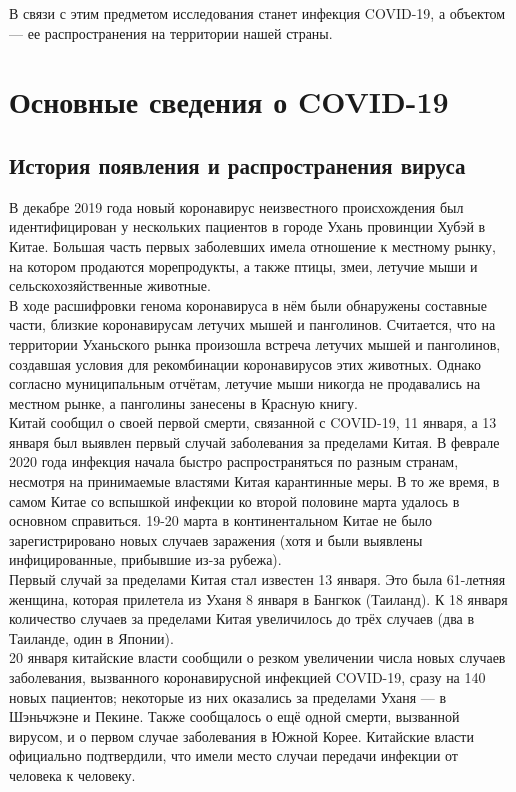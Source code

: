 \documentclass[a4paper, 12pt]{extarticle}
\begin{document}
В связи с этим предметом исследования станет инфекция
COVID-19, а объектом — ее распространения на территории нашей страны.
\newpage

\section{Основные сведения о COVID-19}
\subsection{История появления и распространения вируса}

В декабре 2019 года новый коронавирус неизвестного происхождения был
идентифицирован у нескольких пациентов в городе Ухань провинции Хубэй в Китае.
Большая часть первых заболевших имела отношение к местному рынку, на котором
продаются морепродукты, а также птицы, змеи, летучие мыши и
сельскохозяйственные животные.
\\

В ходе расшифровки генома коронавируса в нём были обнаружены составные части, близкие коронавирусам летучих мышей и
панголинов. Считается, что на территории Уханьского рынка произошла встреча
летучих мышей и панголинов, создавшая условия для рекомбинации коронавирусов
этих животных. Однако согласно муниципальным отчётам, летучие мыши никогда не
продавались на местном рынке, а панголины занесены в Красную книгу.
\\

Китай сообщил о своей первой смерти, связанной с COVID-19, 11 января, а 13
января был выявлен первый случай заболевания за пределами Китая. В феврале 2020
года инфекция начала быстро распространяться по разным странам, несмотря на
принимаемые властями Китая карантинные меры. В то же время, в самом Китае со
вспышкой инфекции ко второй половине марта удалось в основном справиться. 19-20
марта в континентальном Китае не было зарегистрировано новых случаев заражения
(хотя и были выявлены инфицированные, прибывшие из-за рубежа).
\\

Первый случай за пределами Китая стал известен 13 января. Это была 61-летняя
женщина, которая прилетела из Уханя 8 января в Бангкок (Таиланд). К 18 января
количество случаев за пределами Китая увеличилось до трёх случаев (два в
Таиланде, один в Японии).
\\

20 января китайские власти сообщили о резком увеличении числа новых случаев
заболевания, вызванного коронавирусной инфекцией COVID-19, сразу на 140 новых
пациентов; некоторые из них оказались за пределами Уханя — в Шэньчжэне и
Пекине. Также сообщалось о ещё одной смерти, вызванной вирусом, и о первом
случае заболевания в Южной Корее. Китайские власти официально подтвердили, что
имели место случаи передачи инфекции от человека к человеку.
\\
\end{document}
